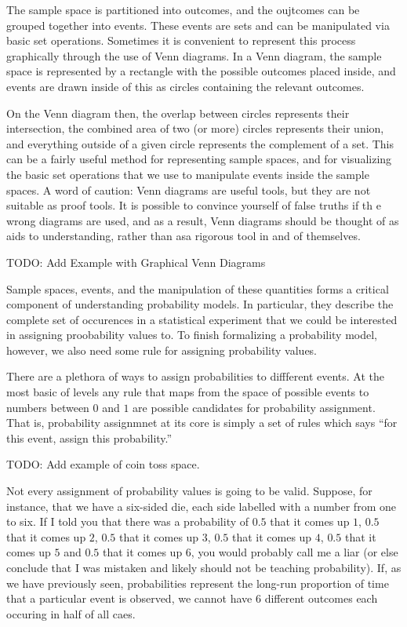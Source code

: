\documentclass[
  letterpaper,
  DIV=11,
  numbers=noendperiod]{scrreprt}
\begin{document}
The sample space is partitioned into outcomes, and the oujtcomes can be
grouped together into events. These events are sets and can be
manipulated via basic set operations. Sometimes it is convenient to
represent this process graphically through the use of Venn diagrams. In
a Venn diagram, the sample space is represented by a rectangle with the
possible outcomes placed inside, and events are drawn inside of this as
circles containing the relevant outcomes.

On the Venn diagram then, the overlap between circles represents their
intersection, the combined area of two (or more) circles represents
their union, and everything outside of a given circle represents the
complement of a set. This can be a fairly useful method for representing
sample spaces, and for visualizing the basic set operations that we use
to manipulate events inside the sample spaces. A word of caution: Venn
diagrams are useful tools, but they are not suitable as proof tools. It
is possible to convince yourself of false truths if th e wrong diagrams
are used, and as a result, Venn diagrams should be thought of as aids to
understanding, rather than asa rigorous tool in and of themselves.

TODO: Add Example with Graphical Venn Diagrams

Sample spaces, events, and the manipulation of these quantities forms a
critical component of understanding probability models. In particular,
they describe the complete set of occurences in a statistical experiment
that we could be interested in assigning proobability values to. To
finish formalizing a probability model, however, we also need some rule
for assigning probability values.

There are a plethora of ways to assign probabilities to diffferent
events. At the most basic of levels any rule that maps from the space of
possible events to numbers between \(0\) and \(1\) are possible
candidates for probability assignment. That is, probability assignmnet
at its core is simply a set of rules which says ``for this event, assign
this probability.''

TODO: Add example of coin toss space.

Not every assignment of probability values is going to be valid.
Suppose, for instance, that we have a six-sided die, each side labelled
with a number from one to six. If I told you that there was a
probability of \(0.5\) that it comes up \(1\), \(0.5\) that it comes up
\(2\), \(0.5\) that it comes up \(3\), \(0.5\) that it comes up \(4\),
\(0.5\) that it comes up \(5\) and \(0.5\) that it comes up \(6\), you
would probably call me a liar (or else conclude that I was mistaken and
likely should not be teaching probability). If, as we have previously
seen, probabilities represent the long-run proportion of time that a
particular event is observed, we cannot have \(6\) different outcomes
each occuring in half of all caes.
\end{document}
